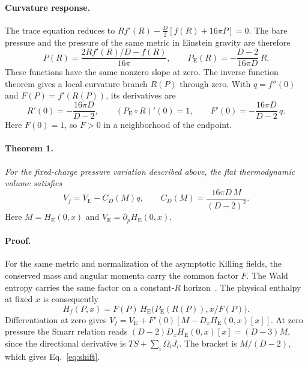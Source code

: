 \documentclass[11pt,a4paper]{article}
\newcommand{\VE}{V_{\mathrm E}}
\newcommand{\PE}{P_{\mathrm E}}
\newcommand{\HE}{H_{\mathrm E}}
\begin{document}
\paragraph{Curvature response.}
The trace equation reduces to \(Rf'(R)-\tfrac D2[f(R)+16\pi P]=0\). The bare pressure and the pressure of the same metric in Einstein gravity are therefore
\begin{equation}\label{eq:trace}
 P(R)=\frac{2Rf'(R)/D-f(R)}{16\pi},\qquad
 \PE(R)=-\frac{D-2}{16\pi D}\,R .
\end{equation}
These functions have the same nonzero slope at zero. The inverse function theorem gives a local curvature branch \(R(P)\) through zero. With \(q=f''(0)\) and \(F(P)=f'(R(P))\), its derivatives are
\begin{equation}\label{eq:slopes}
 R'(0)=-\frac{16\pi D}{D-2},\qquad
 (\PE\circ R)'(0)=1,\qquad F'(0)=-\frac{16\pi D}{D-2}\,q .
\end{equation}
Here \(F(0)=1\), so \(F>0\) in a neighborhood of the endpoint.

\paragraph{Theorem 1.}
\emph{For the fixed-charge pressure variation described above, the flat thermodynamic volume satisfies}
\begin{equation}\label{eq:shift}
 \boxed{\displaystyle V_f=\VE-C_D(M)q,\qquad
 C_D(M)=\frac{16\pi D\,M}{(D-2)^2}.}
\end{equation}
Here \(M=\HE(0,x)\) and \(\VE=\partial_p\HE(0,x)\).

\paragraph{Proof.}
For the same metric and normalization of the asymptotic Killing fields, the conserved mass and angular momenta carry the common factor \(F\). The Wald entropy carries the same factor on a constant-\(R\) horizon~\cite{koga}. The physical enthalpy at fixed \(x\) is consequently
\begin{equation}\label{eq:enthalpy}
 H_f(P,x)=F(P)\,\HE\bigl(\PE(R(P)),x/F(P)\bigr).
\end{equation}
Differentiation at zero gives \(V_f=\VE+F'(0)[M-D_x\HE(0,x)[x]]\). At zero pressure the Smarr relation reads \((D-2)D_x\HE(0,x)[x]=(D-3)M\), since the directional derivative is \(TS+\sum_i\Omega_iJ_i\). The bracket is \(M/(D-2)\), which gives Eq.~\eqref{eq:shift}. \hfill\qedsymbol
\end{document}

